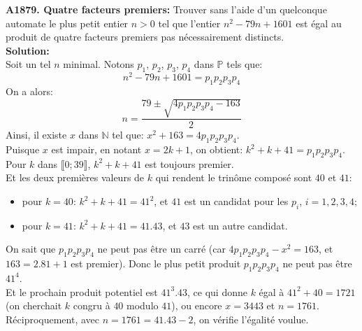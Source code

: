 \documentclass[11pt] {article}
\newcommand{\N} {\mathbb{N}}
\newcommand{\PS} {\mathbb{P}}
\begin{document}



\textbf{A1879. Quatre facteurs premiers:} Trouver sans l'aide d'un quelconque automate le plus petit entier $n > 0$ tel que l'entier $n^{2} - 79n + 1601$ est égal au produit de quatre facteurs premiers pas nécessairement distincts.\\

\textbf{Solution:}\\
Soit un tel $n$ minimal. Notons $p_{1}$, $p_{2}$, $p_{3}$, $p_{4}$ dans $\PS$ tels que: \[n^{2} - 79n + 1601 = p_{1}p_{2}p_{3}p_{4}\]
On a alors: \[n = \frac{79 \pm \sqrt{4p_{1}p_{2}p_{3}p_{4} - 163}}{2}\]
Ainsi, il existe $x$ dans $\N$ tel que: $x^{2} + 163 = 4p_{1}p_{2}p_{3}p_{4}$.\\

Puisque $x$ est impair, en notant $x = 2k+1$, on obtient: $k^{2} + k + 41 = p_{1}p_{2}p_{3}p_{4}$.\\
Pour $k$ dans $\llbracket 0; 39\rrbracket$, $k^{2} + k + 41$ est toujours premier.\\
Et les deux premières valeurs de $k$ qui rendent le trinôme composé sont $40$ et $41$:
\begin{itemize}
\item pour $k = 40$: $k^{2} + k + 41 = 41^{2}$, et $41$ est un candidat pour les $p_{i}$, $i = 1, 2, 3, 4$;
\item pour $k = 41$: $k^{2} + k + 41 = 41.43$, et $43$ est un autre candidat.\\
\end{itemize}

On sait que $p_{1}p_{2}p_{3}p_{4}$ ne peut pas être un carré (car $4p_{1}p_{2}p_{3}p_{4} - x^{2} = 163$, et $163 = 2.81 + 1$ est premier).
Donc le plus petit produit $p_{1}p_{2}p_{3}p_{4}$ ne peut pas être $41^{4}$.\\

Et le prochain produit potentiel est $41^{3}.43$, ce qui donne $k$ égal à $41^{2} + 40 = 1721$ (on cherchait $k$ congru à $40$ modulo $41$), ou encore $x = 3443$ et $n = 1761$.\\

Réciproquement, avec $n = 1761 = 41.43 - 2$, on vérifie l'égalité voulue.
\end{document}
